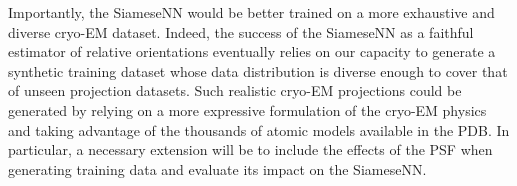 Importantly, the SiameseNN would be better trained on a more exhaustive and diverse cryo-EM dataset.
Indeed, the success of the SiameseNN as a faithful estimator of relative orientations eventually relies on our capacity to generate a synthetic training dataset whose data distribution is diverse enough to cover that of unseen projection datasets.
Such realistic cryo-EM projections could be generated by relying on a more expressive formulation of the cryo-EM physics and taking advantage of the thousands of atomic models available in the PDB\@.
In particular, a necessary extension will be to include the effects of the PSF when generating training data and evaluate its impact on the SiameseNN\@. %


